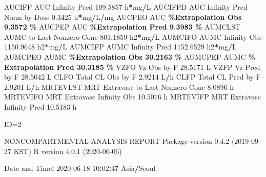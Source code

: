 \documentclass[
  10pt,
]{krantz}
\makeatletter
\newenvironment{Shaded}{\begin{snugshade}}{\end{snugshade}}
\newcommand{\DecValTok}[1]{\textcolor[rgb]{0.00,0.00,0.81}{#1}}
\newcommand{\FloatTok}[1]{\textcolor[rgb]{0.00,0.00,0.81}{#1}}
\newcommand{\NormalTok}[1]{#1}
\newcommand{\OperatorTok}[1]{\textcolor[rgb]{0.81,0.36,0.00}{\textbf{#1}}}
\newcommand{\StringTok}[1]{\textcolor[rgb]{0.31,0.60,0.02}{#1}}
\newenvironment{kframe}{%
\medskip{}
\setlength{\fboxsep}{.8em}
 \def\at@end@of@kframe{}%
 \ifinner\ifhmode%
  \def\at@end@of@kframe{\end{minipage}}%
  \begin{minipage}{\columnwidth}%
 \fi\fi%
 \def\FrameCommand##1{\hskip\@totalleftmargin \hskip-\fboxsep
 \colorbox{shadecolor}{##1}\hskip-\fboxsep
     \hskip-\linewidth \hskip-\@totalleftmargin \hskip\columnwidth}%
 \MakeFramed {\advance\hsize-\width
   \@totalleftmargin\z@ \linewidth\hsize
   \@setminipage}}%
 {\par\unskip\endMakeFramed%
 \at@end@of@kframe}
\renewenvironment{Shaded}{\begin{kframe}}{\end{kframe}}
\makeatother
\begin{document}
\begin{Shaded}
\begin{Highlighting}[]
\NormalTok{AUCIFP     AUC Infinity Pred                             }\FloatTok{109.5857}\NormalTok{ h}\OperatorTok{*}\NormalTok{mg}\OperatorTok{/}\NormalTok{L}
\NormalTok{AUCIFPD    AUC Infinity Pred Norm by Dose                  }\FloatTok{0.3425}\NormalTok{ h}\OperatorTok{*}\NormalTok{mg}\OperatorTok{/}\NormalTok{L}\OperatorTok{/}\NormalTok{mg}
\NormalTok{AUCPEO     AUC }\OperatorTok{\%Extrapolation Obs                          9.3572 \%}
\NormalTok{AUCPEP     AUC }\OperatorTok{\%Extrapolation Pred                         9.3983 \%}
\NormalTok{AUMCLST    AUMC to Last Nonzero Conc                     }\FloatTok{803.1859}\NormalTok{ h2}\OperatorTok{*}\NormalTok{mg}\OperatorTok{/}\NormalTok{L}
\NormalTok{AUMCIFO    AUMC Infinity Obs                            }\FloatTok{1150.9648}\NormalTok{ h2}\OperatorTok{*}\NormalTok{mg}\OperatorTok{/}\NormalTok{L}
\NormalTok{AUMCIFP    AUMC Infinity Pred                           }\FloatTok{1152.6529}\NormalTok{ h2}\OperatorTok{*}\NormalTok{mg}\OperatorTok{/}\NormalTok{L}
\NormalTok{AUMCPEO    AUMC }\OperatorTok{\%Extrapolation Obs                        30.2163 \%}
\NormalTok{AUMCPEP    AUMC }\OperatorTok{\% Extrapolation Pred                      30.3185 \%}
\NormalTok{VZFO       Vz Obs by F                                    }\FloatTok{28.5171}\NormalTok{ L}
\NormalTok{VZFP       Vz Pred by F                                   }\FloatTok{28.5042}\NormalTok{ L}
\NormalTok{CLFO       Total CL Obs by F                               }\FloatTok{2.9214}\NormalTok{ L}\OperatorTok{/}\NormalTok{h}
\NormalTok{CLFP       Total CL Pred by F                              }\FloatTok{2.9201}\NormalTok{ L}\OperatorTok{/}\NormalTok{h}
\NormalTok{MRTEVLST   MRT Extravasc to Last Nonzero Conc              }\FloatTok{8.0896}\NormalTok{ h}
\NormalTok{MRTEVIFO   MRT Extravasc Infinity Obs                     }\FloatTok{10.5076}\NormalTok{ h}
\NormalTok{MRTEVIFP   MRT Extravasc Infinity Pred                    }\FloatTok{10.5183}\NormalTok{ h}





\NormalTok{ID=}\DecValTok{2}

\NormalTok{                        NONCOMPARTMENTAL ANALYSIS REPORT}
\NormalTok{                       Package version }\DecValTok{0}\NormalTok{.}\FloatTok{4.2}\NormalTok{ (}\DecValTok{2019{-}09{-}27}\NormalTok{ KST)}
\NormalTok{                          R version }\DecValTok{4}\NormalTok{.}\FloatTok{0.1}\NormalTok{ (}\DecValTok{2020{-}06{-}06}\NormalTok{)}

\NormalTok{Date and Time}\OperatorTok{:}\StringTok{ }\DecValTok{2020{-}06{-}18} \DecValTok{10}\OperatorTok{:}\DecValTok{02}\OperatorTok{:}\DecValTok{47}\NormalTok{ Asia}\OperatorTok{/}\NormalTok{Seoul}


\end{Highlighting}
\end{Shaded}
\end{document}

